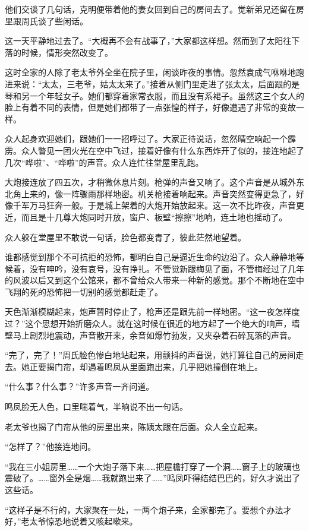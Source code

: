 \par 他们交谈了几句话，克明便带着他的妻女回到自己的房间去了。觉新弟兄还留在房里跟周氏谈了些闲话。
\par 这一天平静地过去了。“大概再不会有战事了，”大家都这样想。然而到了太阳往下落的时候，情形突然改变了。
\par 这时全家的人除了老太爷外全坐在院子里，闲谈昨夜的事情。忽然袁成气咻咻地跑进来说：“太太，三老爷，姑太太来了。”接着从侧门里走进了张太太，后面跟的是琴和另一个年轻女子。她们都穿着家常衣服，而且没有系裙子。虽然这三个女人的脸上有着不同的表情，但是她们都带了一点张惶的样子，好像遭遇了非常的变故一样。
\par 众人起身欢迎她们，跟她们一一招呼过了。大家正待说话，忽然晴空响起一个霹雳。众人瞥见一团火光在空中飞过，接着好像有什么东西炸开了似的，接连地起了几次“哗啦”、“哗啦”的声音。众人连忙往堂屋里乱跑。
\par 大炮接连放了四五次，才稍微休息片刻。枪弹的声音又响了。这个声音是从城外东北角上来的，像一阵骤雨那样地密。机关枪接着响起来。声音突然变得更急了，好像千军万马狂奔一般。于是城上架着的大炮开始放起来。这一次不比昨夜，声音更近，而且是十几尊大炮同时开放，窗户、板壁“擦擦”地响，连土地也摇动了。
\par 众人躲在堂屋里不敢说一句话，脸色都变青了，彼此茫然地望着。
\par 谁都感觉到那个不可抗拒的恐怖，都明白自己是逼近生命的边沿了。众人静静地等候着，没有呻吟，没有哀号，没有挣扎。不管觉新跟梅见了面，不管梅经过了几年的风波以后又到这个公馆来，都不曾给众人带来一种新的感觉。那个不断地在空中飞翔的死的恐怖把一切别的感觉都赶走了。
\par 天色渐渐模糊起来，炮声暂时停止了，枪声还是跟先前一样地密。“这一夜怎样度过？”这个思想开始折磨众人。就在这时候在很近的地方起了一个绝大的响声，墙壁马上剧烈地震动，声音散开来，余音如爆竹勃发，又夹杂着石碎瓦落的声音。
\par “完了，完了！”周氏脸色惨白地站起来，用颤抖的声音说，她打算往自己的房间走去。她正要揭门帘，却遇着鸣凤从里面跑出来，几乎把她撞倒在地上。
\par “什么事？什么事？”许多声音一齐问道。
\par 鸣凤脸无人色，口里喘着气，半晌说不出一句话。
\par 老太爷也揭了门帘从他的房里出来，陈姨太跟在后面。众人全立起来。
\par “怎样了？”他接连地问。
\par “我在三小姐房里……一个大炮子落下来……把屋檐打穿了一个洞……窗子上的玻璃也震破了。……窗外全是烟……我就跑出来了……”鸣凤吓得结结巴巴的，好久才说出了这些话。
\par “这样子是不行的，大家聚在一处，一两个炮子来，全家都完了。要想个办法才好，”老太爷惊恐地说着又咳起嗽来。
